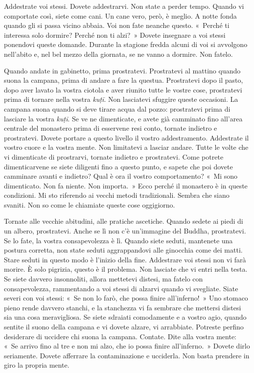 Addestrate voi stessi. Dovete addestrarvi. Non state a perder tempo.
Quando vi comportate così, siete come cani. Un cane vero, però, è
meglio. A notte fonda quando gli si passa vicino abbaia. Voi non fate
neanche questo. «~Perché ti interessa solo dormire? Perché non ti
alzi?~» Dovete insegnare a voi stessi ponendovi queste domande. Durante
la stagione fredda alcuni di voi si avvolgono nell'abito e, nel bel
mezzo della giornata, se ne vanno a dormire. Non fatelo.

Quando andate in gabinetto, prima prostratevi. Prostratevi al mattino
quando suona la campana, prima di andare a fare la questua. Prostratevi
dopo il pasto, dopo aver lavato la vostra ciotola e aver riunito tutte
le vostre cose, prostratevi prima di tornare nella vostra \emph{kuṭī}.
Non lasciatevi sfuggire queste occasioni. La campana suona quando si
deve tirare acqua dal pozzo: prostratevi prima di lasciare la vostra
\emph{kuṭī}. Se ve ne dimenticate, e avete già camminato fino all'area
centrale del monastero prima di esservene resi conto, tornate indietro e
prostratevi. Dovete portare a questo livello il vostro addestramento.
Addestrate il vostro cuore e la vostra mente. Non limitatevi a lasciar
andare. Tutte le volte che vi dimenticate di prostrarvi, tornate
indietro e prostratevi. Come potrete dimenticarvene se siete diligenti
fino a questo punto, e sapete che poi dovete camminare avanti e
indietro? Qual è ora il vostro comportamento? «~Mi sono dimenticato. Non
fa niente. Non importa.~» Ecco perché il monastero è in queste
condizioni. Mi sto riferendo ai vecchi metodi tradizionali. Sembra che
siano svaniti. Non so come le chiamiate queste cose oggigiorno.

Tornate alle vecchie abitudini, alle pratiche ascetiche. Quando sedete
ai piedi di un albero, prostratevi. Anche se lì non c'è un'immagine del
Buddha, prostratevi. Se lo fate, la vostra consapevolezza è lì. Quando
siete seduti, mantenete una postura corretta, non state seduti
aggrappandovi alle ginocchia come dei matti. Stare seduti in questo modo
è l'inizio della fine. Addestrare voi stessi non vi farà morire. È solo
pigrizia, questo è il problema. Non lasciate che vi entri nella testa.
Se siete davvero insonnoliti, allora mettetevi distesi, ma fatelo con
consapevolezza, rammentando a voi stessi di alzarvi quando vi svegliate.
Siate severi con voi stessi: «~Se non lo farò, che possa finire
all'inferno!~» Uno stomaco pieno rende davvero stanchi, e la stanchezza
vi fa sembrare che mettersi distesi sia una cosa meravigliosa. Se siete
sdraiati comodamente e a vostro agio, quando sentite il suono della
campana e vi dovete alzare, vi arrabbiate. Potreste perfino desiderare
di uccidere chi suona la campana. Contate. Dite alla vostra mente: «~Se
arrivo fino al tre e non mi alzo, che io possa finire all'inferno.~»
Dovete dirlo seriamente. Dovete afferrare la contaminazione e ucciderla.
Non basta prendere in giro la propria mente.

